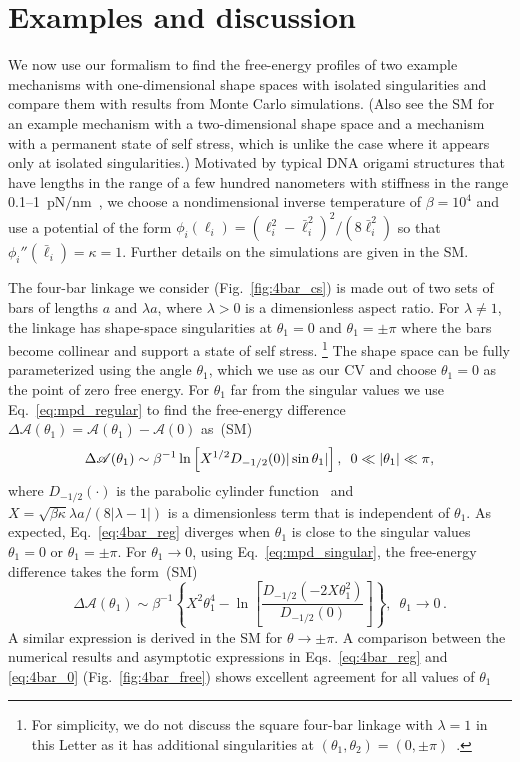 \section{Examples and discussion}

We now use our formalism to find the free-energy profiles of two example mechanisms with one-dimensional shape spaces with isolated singularities and compare them with results from Monte Carlo simulations.
(Also see the SM for an example mechanism with a two-dimensional shape space and a mechanism with a permanent state of self stress, which is unlike the case where it appears only at isolated singularities.)
Motivated by typical DNA origami structures that have lengths in the range of a few hundred nanometers with stiffness in the range 0.1--1~pN$/$nm~\cite{jung2020}, we choose a nondimensional inverse temperature of $\beta = 10^{4}$ and use a potential of the form $\phi_{i}(\ell_{i}) = (\ell_{i}^{2} - \bar{\ell}_{i}^{2})^{2}/(8\bar{\ell}_{i}^{2})$ so that $\phi_{i}''(\bar{\ell}_{i}) = \kappa = 1$.
Further details on the simulations are given in the SM.

The four-bar linkage we consider (Fig.~\ref{fig:4bar_cs}) is made out of two sets of bars of lengths $a$ and $\lambda a$, where $\lambda > 0$ is a dimensionless aspect ratio.
For $\lambda \ne 1$, the linkage has shape-space singularities at $\theta_{1} = 0$ and $\theta_{1} = \pm \pi$ where the bars become collinear and support a state of self stress.%
\footnote{For simplicity, we do not discuss the square four-bar linkage with $\lambda=1$ in this Letter as it has additional singularities at $(\theta_{1}, \theta_{2}) = (0, \pm\pi)$~\cite{yang1994}.}
The shape space can be fully parameterized using the angle $\theta_{1}$, which we use as our CV and choose $\theta_{1} = 0$ as the point of zero free energy.
For $\theta_{1}$ far from the singular values we use Eq.~\eqref{eq:mpd_regular} to find the free-energy difference $\Delta\mathscr{A}(\theta_1) = \mathscr{A}(\theta_1) - \mathscr{A}(0)$ as~(SM)
%
\begin{equation}
  \Delta\mathscr{A}(\theta_{1}) \sim \beta^{-1}\ln\left[X^{1/2}
    D_{-1/2}(0)|\sin{\theta_1}|\right],\enspace 0 \ll \lvert\theta_{1}\rvert \ll \pi,
  \label{eq:4bar_reg}
\end{equation}
%
where $D_{-1/2}(\cdot)$ is the parabolic cylinder function~\cite{olver2010} and $X=\sqrt{\beta \kappa}\lambda a/(8|\lambda-1|)$ is a dimensionless term that is independent of $\theta_1$.
As expected, Eq.~\eqref{eq:4bar_reg} diverges when $\theta_{1}$ is close to the singular values $\theta_{1} = 0$ or $\theta_{1} = \pm\pi$.
For $\theta_{1} \to 0$, using Eq.~\eqref{eq:mpd_singular}, the free-energy difference takes the form~(SM)
%
\begin{equation}
  \Delta\mathscr{A}(\theta_1) \sim \beta^{-1}\left\{X^2\theta_1^4 - \ln\left[\dfrac{D_{-1/2}(-2X\theta_1^2)}{D_{-1/2}(0)}\right]\right\},\enspace \theta_{1}\to 0\,.
  \label{eq:4bar_0}
\end{equation}
A similar expression is derived in the SM for $\theta \to \pm \pi$.
A comparison between the numerical results and asymptotic expressions in Eqs.~\eqref{eq:4bar_reg} and \eqref{eq:4bar_0} (Fig.~\ref{fig:4bar_free}) shows excellent agreement for all values of $\theta_{1}$

